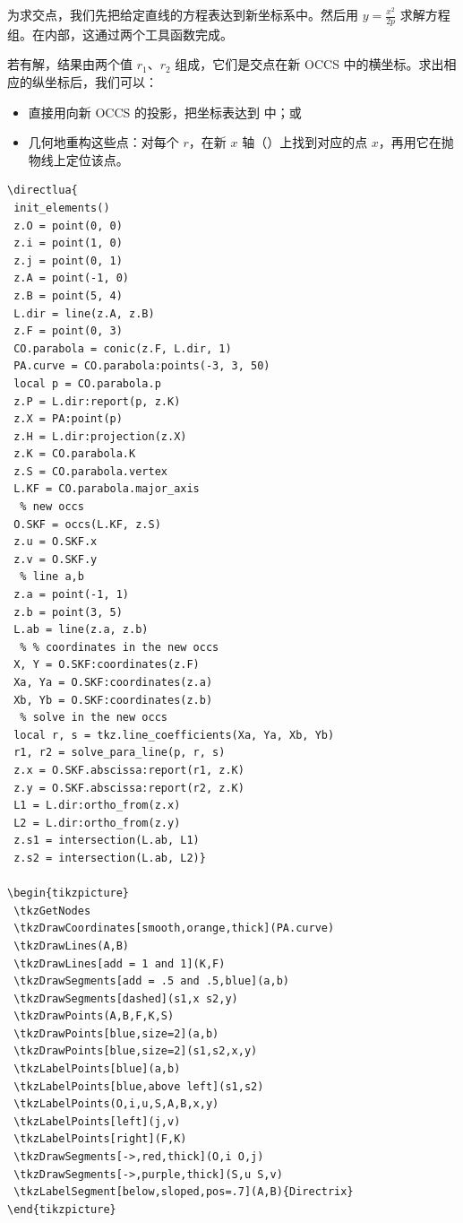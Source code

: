 \vspace{1em}

为求交点，我们先把给定直线的方程表达到新坐标系中。然后用 $y = \frac{x^2}{2p}$ 求解方程组。在内部，这通过两个工具函数完成。

\vspace{1em}

若有解，结果由两个值 $r_1$、$r_2$ 组成，它们是交点在新 OCCS 中的横坐标。求出相应的纵坐标后，我们可以：
\begin{itemize}
  \item 直接用向新 OCCS 的投影，把坐标表达到 \TIKZ{} 中；或
  \item 几何地重构这些点：对每个 $r$，在新 $x$ 轴（）上找到对应的点 $x$，再用它在抛物线上定位该点。
\end{itemize}

\vspace{1em}
\begin{verbatim}
\directlua{
 init_elements()
 z.O = point(0, 0)
 z.i = point(1, 0)
 z.j = point(0, 1)
 z.A = point(-1, 0)
 z.B = point(5, 4)
 L.dir = line(z.A, z.B)
 z.F = point(0, 3)
 CO.parabola = conic(z.F, L.dir, 1)
 PA.curve = CO.parabola:points(-3, 3, 50)
 local p = CO.parabola.p
 z.P = L.dir:report(p, z.K)
 z.X = PA:point(p)
 z.H = L.dir:projection(z.X)
 z.K = CO.parabola.K
 z.S = CO.parabola.vertex
 L.KF = CO.parabola.major_axis
  % new occs
 O.SKF = occs(L.KF, z.S)
 z.u = O.SKF.x
 z.v = O.SKF.y
  % line a,b
 z.a = point(-1, 1)
 z.b = point(3, 5)
 L.ab = line(z.a, z.b)
  % % coordinates in the new occs
 X, Y = O.SKF:coordinates(z.F)
 Xa, Ya = O.SKF:coordinates(z.a)
 Xb, Yb = O.SKF:coordinates(z.b)
  % solve in the new occs
 local r, s = tkz.line_coefficients(Xa, Ya, Xb, Yb)
 r1, r2 = solve_para_line(p, r, s)
 z.x = O.SKF.abscissa:report(r1, z.K)
 z.y = O.SKF.abscissa:report(r2, z.K)
 L1 = L.dir:ortho_from(z.x)
 L2 = L.dir:ortho_from(z.y)
 z.s1 = intersection(L.ab, L1)
 z.s2 = intersection(L.ab, L2)}

\begin{tikzpicture}
 \tkzGetNodes
 \tkzDrawCoordinates[smooth,orange,thick](PA.curve)
 \tkzDrawLines(A,B)
 \tkzDrawLines[add = 1 and 1](K,F)
 \tkzDrawSegments[add = .5 and .5,blue](a,b)
 \tkzDrawSegments[dashed](s1,x s2,y)
 \tkzDrawPoints(A,B,F,K,S)
 \tkzDrawPoints[blue,size=2](a,b)
 \tkzDrawPoints[blue,size=2](s1,s2,x,y)
 \tkzLabelPoints[blue](a,b)
 \tkzLabelPoints[blue,above left](s1,s2)
 \tkzLabelPoints(O,i,u,S,A,B,x,y)
 \tkzLabelPoints[left](j,v)
 \tkzLabelPoints[right](F,K)
 \tkzDrawSegments[->,red,thick](O,i O,j)
 \tkzDrawSegments[->,purple,thick](S,u S,v)
 \tkzLabelSegment[below,sloped,pos=.7](A,B){Directrix}
\end{tikzpicture}
\end{verbatim}

